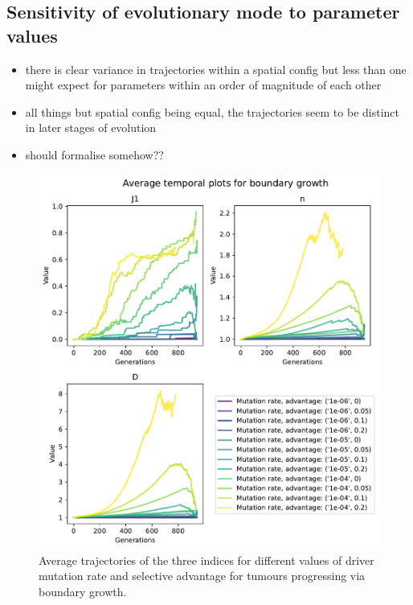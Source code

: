 \subsection{Sensitivity of evolutionary mode to parameter values}
\begin{itemize}
    \item there is clear variance in trajectories within a spatial config but less than one might expect for parameters within an order of magnitude of each other
    \item all things but spatial config being equal, the trajectories seem to be distinct in later stages of evolution
    \item should formalise somehow??
\end{itemize}
\begin{figure}
    \centering
    \includegraphics[width=\textwidth]{Chapter_3/figures/boundary-temporal.pdf}
    \caption{Average trajectories of the three indices for different values of driver mutation rate and selective advantage for tumours progressing via boundary growth.}
    \label{fig:boundary-temporal}
\end{figure}
